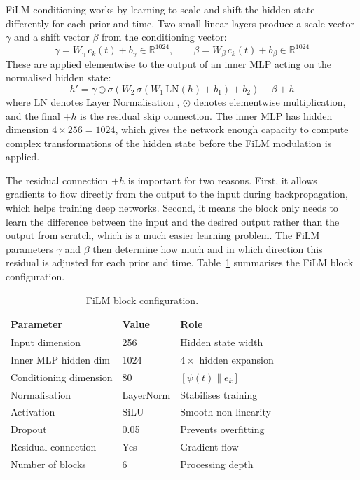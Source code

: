 FiLM conditioning works by learning 
to scale and shift the hidden state 
differently for each prior and time. 
Two small linear layers produce a 
scale vector $\gamma$ and a shift 
vector $\beta$ from the conditioning 
vector:
\begin{equation}
    \gamma = W_\gamma\, c_k(t) + 
    b_\gamma \in \mathbb{R}^{1024}, 
    \qquad 
    \beta = W_\beta\, c_k(t) + 
    b_\beta \in \mathbb{R}^{1024}
\end{equation}
These are applied elementwise to the 
output of an inner MLP acting on the 
normalised hidden state:
\begin{equation}
    h' = \gamma \odot 
    \sigma\!\left(
    W_2\,\sigma(W_1\,
    \mathrm{LN}(h) + b_1) + b_2
    \right) 
    + \beta + h
    \label{eq:film_block}
\end{equation}
where $\mathrm{LN}$ denotes Layer 
Normalisation \citep{ba2016}, 
$\odot$ denotes elementwise 
multiplication, and the final $+h$ 
is the residual skip connection. The 
inner MLP has hidden dimension 
$4 \times 256 = 1024$, which gives 
the network enough capacity to compute 
complex transformations of the hidden 
state before the FiLM modulation is 
applied.

The residual connection $+h$ is 
important for two reasons. First, it 
allows gradients to flow directly 
from the output to the input during 
backpropagation, which helps training 
deep networks. Second, it means the 
block only needs to learn the 
difference between the input and the 
desired output rather than the output 
from scratch, which is a much easier 
learning problem. The FiLM parameters 
$\gamma$ and $\beta$ then determine 
how much and in which direction this 
residual is adjusted for each prior 
and time. Table~\ref{tab:film_block} 
summarises the FiLM block configuration.

\begin{table}[h]
\centering
\caption{FiLM block configuration.}
\label{tab:film_block}
{\singlespacing
\begin{tabular}{lll}
\hline
Parameter & Value & Role \\
\hline
Input dimension & 256 
& Hidden state width \\
Inner MLP hidden dim & 1024 
& $4\times$ hidden expansion \\
Conditioning dimension & 80 
& $[\psi(t) \| e_k]$ \\
Normalisation & LayerNorm 
& Stabilises training \\
Activation & SiLU 
& Smooth non-linearity \\
Dropout & 0.05 
& Prevents overfitting \\
Residual connection & Yes 
& Gradient flow \\
Number of blocks & 6 
& Processing depth \\
\hline
\end{tabular}}
\end{table}

